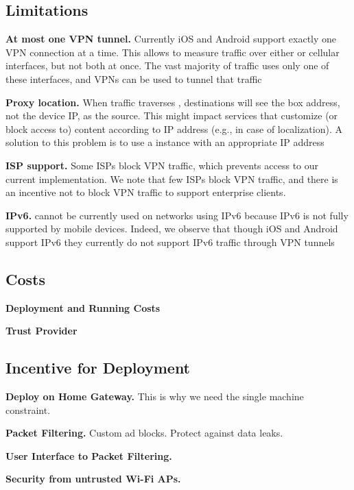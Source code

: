 \subsection{Limitations}

\noindent\textbf{At most one VPN tunnel.}
Currently iOS and Android support exactly one VPN connection at a time. 
This allows \meddle to measure traffic over either \wifi or cellular interfaces, but not both at once.
The vast majority of traffic uses only one of these interfaces, and VPNs can be used to tunnel that traffic

\noindent\textbf{Proxy location.} 
When traffic traverses \meddle, destinations will see the \meddle box address, not the device IP, as the source. 
This might impact services  that customize (or block access to) content according to IP address (e.g., in case of localization). 
A solution to this problem is to use a \meddle{} instance with an appropriate IP address

\noindent\textbf{ISP support.}
Some ISPs block VPN traffic, which prevents access to our current \meddle implementation. 
We note that few ISPs block VPN traffic, and there is an incentive not to block VPN traffic to support enterprise clients.

\noindent\textbf{IPv6.}
\meddle{} cannot be currently used on networks using IPv6 because IPv6 is not fully supported by mobile devices. 
Indeed, we observe that though iOS and Android support IPv6 they currently do not support IPv6 traffic through VPN tunnels




\subsection{Costs}

\noindent\textbf{Deployment and Running Costs}

\noindent\textbf{Trust Provider}

\subsection{Incentive for Deployment}

\noindent \textbf{Deploy on Home Gateway.}
This is why we need the single machine constraint. 

\noindent \textbf{Packet Filtering.}
Custom ad blocks. Protect against data leaks. 

\noindent \textbf{User Interface to Packet Filtering.}

\noindent \textbf{Security from untrusted Wi-Fi APs.}




